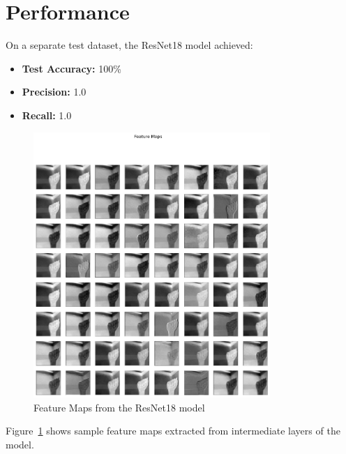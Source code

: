 \documentclass[12pt, a4paper]{article}
\begin{document}
\section{Performance}
On a separate test dataset, the ResNet18 model achieved:
\begin{itemize}
    \item \textbf{Test Accuracy:} 100\%
    \item \textbf{Precision:} 1.0
    \item \textbf{Recall:} 1.0
\end{itemize}
\begin{figure}[H]
    \centering
    \includegraphics[width=0.8\textwidth]{../../plots/ResNet18_Visualize.png}
    \caption{Feature Maps from the ResNet18 model}
    \label{fig:resnet18_visualize}
\end{figure}
Figure~\ref{fig:resnet18_visualize} shows sample feature maps extracted from intermediate layers of the model.
\end{document}
